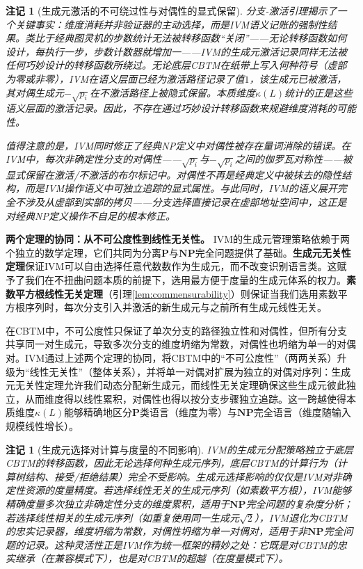 \documentclass{ctexart}
\newtheorem{remark}[theorem]{注记}
\begin{document}
	\begin{remark}[生成元激活的不可绕过性与对偶性的显式保留]
		分支-激活引理揭示了一个关键事实：维度消耗并非验证器的主动选择，而是IVM语义记账的强制性结果。类比于经典图灵机的步数统计无法被转移函数``关闭''——无论转移函数如何设计，每执行一步，步数计数器就增加一——IVM的生成元激活记录同样无法被任何巧妙设计的转移函数所绕过。无论底层CBTM在纸带上写入何种符号（虚部为零或非零），IVM在语义层面已经为激活路径记录了值$1$，该生成元已被激活，其对偶生成元$-\sqrt{p_i}$在不激活路径上被隐式保留。本质维度$\kappa(L)$统计的正是这些语义层面的激活记录。因此，不存在通过巧妙设计转移函数来规避维度消耗的可能性。
		
		值得注意的是，IVM同时修正了经典NP定义中对偶性被存在量词消除的错误。在IVM中，每次非确定性分支的对偶性——$\sqrt{p_i}$与$-\sqrt{p_i}$之间的伽罗瓦对称性——被显式保留在激活/不激活的布尔标记中。对偶性不再是经典定义中被抹去的隐性结构，而是IVM操作语义中可独立追踪的显式属性。与此同时，IVM的语义展开完全不涉及从虚部到实部的拷贝——分支选择直接记录在虚部地址空间中，这正是对经典NP定义操作不自足的根本修正。
	\end{remark}
	
	\textbf{两个定理的协同：从不可公度性到线性无关性。} IVM的生成元管理策略依赖于两个独立的数学定理，它们共同为分离$\mathbf{P}$与$\mathbf{NP}$完全问题提供了基础。\textbf{生成元无关性定理}\cite{models2026}保证IVM可以自由选择任意代数数作为生成元，而不改变识别语言类。这赋予了我们在不扭曲问题本质的前提下，选用最方便于度量的生成元体系的权力。\textbf{素数平方根线性无关定理}（引理\ref{lem:commensurability}）则保证当我们选用素数平方根序列时，每次分支引入并激活的新生成元与之前所有生成元线性无关。
	
	在CBTM中，不可公度性只保证了单次分支的路径独立性和对偶性，但所有分支共享同一对生成元，导致多次分支的维度坍缩为常数，对偶性也坍缩为单一的对偶对。IVM通过上述两个定理的协同，将CBTM中的``不可公度性''（两两关系）升级为``线性无关性''（整体关系），并将单一对偶对扩展为独立的对偶对序列：生成元无关性定理允许我们动态分配新生成元，而线性无关定理确保这些生成元彼此独立，从而维度得以线性累积，对偶性也得以按分支步骤独立追踪。这一跨越使得本质维度$\kappa(L)$能够精确地区分$\mathbf{P}$类语言（维度为零）与$\mathbf{NP}$完全语言（维度随输入规模线性增长）。
	
	\begin{remark}[生成元选择对计算与度量的不同影响]
		IVM的生成元分配策略独立于底层CBTM的转移函数，因此无论选择何种生成元序列，底层CBTM的计算行为（计算树结构、接受/拒绝结果）完全不受影响。生成元选择影响的仅仅是IVM对非确定性资源的度量精度。若选择线性无关的生成元序列（如素数平方根），IVM能够精确度量多次独立非确定性分支的维度累积，适用于$\mathbf{NP}$完全问题的复杂度分析；若选择线性相关的生成元序列（如重复使用同一生成元$\sqrt{2}$），IVM退化为CBTM的忠实记录器，维度坍缩为常数，对偶性坍缩为单一对偶对，适用于非$\mathbf{NP}$完全问题的记录。这种灵活性正是IVM作为统一框架的精妙之处：它既是对CBTM的忠实继承（在兼容模式下），也是对CBTM的超越（在度量模式下）。
	\end{remark}
	
\end{document}
